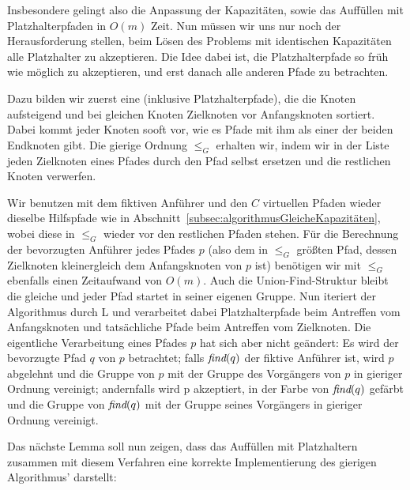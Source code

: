 Insbesondere gelingt also die Anpassung der Kapazitäten, sowie das Auffüllen mit Platzhalterpfaden in $O(m)$ Zeit.
Nun müssen wir uns nur noch der Herausforderung stellen, beim Lösen des Problems mit identischen Kapazitäten alle
Platzhalter zu akzeptieren.
Die Idee dabei ist, die Platzhalterpfade so früh wie möglich zu akzeptieren, und erst danach alle anderen Pfade zu
betrachten.

Dazu bilden wir zuerst eine  (inklusive Platzhalterpfade), die die Knoten
aufsteigend und bei gleichen Knoten Zielknoten vor Anfangsknoten sortiert.
Dabei kommt jeder Knoten sooft vor, wie es Pfade mit ihm als einer der beiden Endknoten gibt.
Die gierige Ordnung $\leq_{G}$ erhalten wir, indem wir in der Liste jeden Zielknoten eines Pfades durch den Pfad selbst
ersetzen und die restlichen Knoten verwerfen.

Wir benutzen mit dem fiktiven Anführer und den $C$ virtuellen Pfaden wieder dieselbe Hilfspfade wie in
Abschnitt~\ref{subsec:algorithmusGleicheKapazitäten}, wobei diese in $\leq_G$ wieder vor den restlichen Pfaden stehen.
Für die Berechnung der bevorzugten Anführer jedes Pfades $p$ (also dem in $\leq_G$ größten Pfad, dessen
Zielknoten kleinergleich dem Anfangsknoten von $p$ ist) benötigen wir mit $\leq_G$ ebenfalls einen Zeitaufwand von
$O(m)$.
Auch die Union-Find-Struktur bleibt die gleiche und jeder Pfad startet in seiner eigenen Gruppe.
Nun iteriert der Algorithmus durch L und verarbeitet dabei Platzhalterpfade beim Antreffen vom
Anfangsknoten und tatsächliche Pfade beim Antreffen vom Zielknoten.
Die eigentliche Verarbeitung eines Pfades $p$ hat sich aber nicht geändert: Es wird der bevorzugte Pfad $q$ von $p$
betrachtet; falls $\text{\em find}(q)$ der fiktive Anführer ist, wird $p$ abgelehnt und die Gruppe von $p$ mit der
Gruppe des Vorgängers von $p$ in gieriger Ordnung vereinigt; andernfalls wird p akzeptiert, in der Farbe von $\text{\em find}(q)$
gefärbt und die Gruppe von $\text{\em find}(q)$ mit der Gruppe seines Vorgängers in gieriger Ordnung vereinigt.

Das nächste Lemma soll nun zeigen, dass das Auffüllen mit Platzhaltern zusammen mit diesem Verfahren eine korrekte
Implementierung des gierigen Algorithmus' darstellt:

